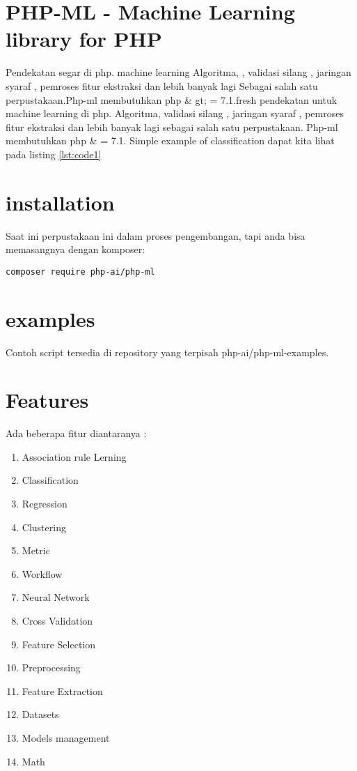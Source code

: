 
\section{PHP-ML - Machine Learning library for PHP}
Pendekatan segar di php. machine learning Algoritma, , validasi silang , jaringan syaraf , pemroses fitur ekstraksi dan lebih banyak lagi Sebagai salah satu perpustakaan.Php-ml membutuhkan php \& gt; = 7.1.fresh pendekatan untuk machine learning di php. Algoritma, validasi silang , jaringan syaraf , pemroses fitur ekstraksi dan lebih banyak lagi sebagai salah satu perpustakaan.
Php-ml membutuhkan php \& = 7.1.
Simple example of classification dapat kita lihat pada listing \ref{lst:code1}

\section{installation} 
Saat ini perpustakaan ini dalam proses pengembangan, tapi anda bisa memasangnya dengan komposer:

\begin{verbatim}composer require php-ai/php-ml\end{verbatim}

\section{examples}
Contoh script tersedia di repository yang terpisah php-ai/php-ml-examples.


\section{Features}
Ada beberapa fitur diantaranya :
\begin{enumerate}
\item Association rule Lerning
\item Classification
\item Regression
\item Clustering
\item Metric
\item Workflow
\item Neural Network
\item Cross Validation
\item Feature Selection
\item Preprocessing
\item Feature Extraction
\item Datasets
\item Models management
\item Math
\end{enumerate}

